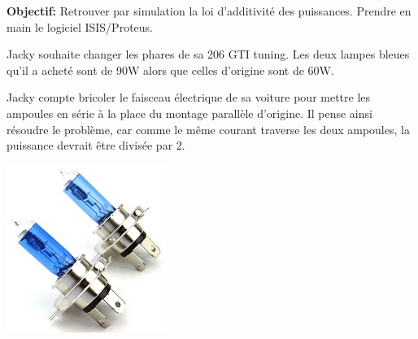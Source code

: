 \documentclass{article}
\begin{document}
\begin{center}

	\vspace{1em}
	\Large
	\textbf{Objectif:} Retrouver par simulation la loi d’additivité des puissances. Prendre en main le logiciel ISIS/Proteus.
\end{center}

\vspace{2em}
\begin{minipage}[b]{0.68\linewidth}
Jacky souhaite changer les phares de sa 206 GTI tuning.
Les deux lampes bleues qu'il a acheté sont de 90W alors que celles d'origine sont de 60W.

Jacky compte bricoler le faisceau électrique de sa voiture pour mettre les ampoules en série à la place du montage parallèle d'origine.
Il pense ainsi résoudre le problème, car comme le même courant traverse les deux ampoules, la puissance devrait être divisée par 2.\\

\end{minipage}
\hfill
\begin{minipage}[b]{0.28\linewidth}
	\centering
	\includegraphics[width=.8\linewidth]{./figures/phare1.png}
\end{minipage}
\end{document}
